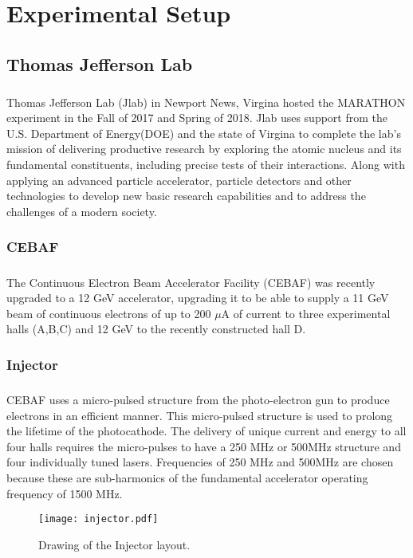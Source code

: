 


\chapter{ Experimental Setup}

\section{Thomas Jefferson Lab}
\paragraph{}Thomas Jefferson Lab (Jlab) in Newport News, Virgina hosted the MARATHON experiment in the Fall of 2017 and Spring of 2018. Jlab uses support from the U.S. Department of Energy(DOE) and the state of Virgina to complete the lab's mission of delivering productive research by exploring the atomic nucleus and its fundamental constituents, including precise tests of their interactions. Along with applying an advanced particle accelerator, particle detectors and other technologies to develop new basic research capabilities and to address the challenges of a modern society.
\subsection{CEBAF}\label{sec:cebaf}
	\paragraph{}The Continuous Electron Beam Accelerator Facility (CEBAF) was recently upgraded to a 12 GeV accelerator, upgrading it to be able to supply a 11 GeV beam of continuous electrons of up to 200 $\mu$A of current to three experimental halls (A,B,C) and 12 GeV to the recently constructed hall D. 
\subsection{Injector}
	\paragraph{} CEBAF uses a micro-pulsed structure from the photo-electron gun to produce electrons in an efficient manner. This micro-pulsed structure is used to prolong the lifetime of the photocathode. The delivery of unique current and energy to all four halls requires the micro-pulses to have a 250 MHz or 500MHz structure and four individually tuned lasers. Frequencies of 250 MHz and 500MHz are chosen because these are sub-harmonics of the fundamental accelerator operating frequency of 1500 MHz. 
	\begin{figure}[h]
	\centering
	\caption{Drawing of the Injector layout. }
	\label{fig:inj}
	\texttt{[image: injector.pdf]} 
	\end{figure} 
